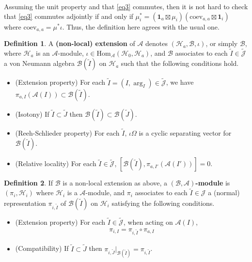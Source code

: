 \documentclass[11pt,b5paper,notitlepage]{article}
\theoremstyle{definition}
\newtheorem{df}{Definition}[section]
\theoremstyle{plain}
\newcommand{\mc}{\mathcal}
\newcommand{\wtd}{\widetilde}
\newcommand{\id}{\mathbf{1}}
\newcommand{\Hom}{\mathrm{Hom}}
\newcommand{\coev}{\mathrm{coev}}
\newcommand{\Jtd}{\widetilde{\mathcal J}}
\numberwithin{equation}{section}
\begin{document}
Assuming the unit property and that \eqref{eq3} commutes, then it is not hard to check that \eqref{eq3} commutes adjointly if and only if $\mu_i^*=(\id_a\boxtimes\mu_i)(\coev_{a,a}\boxtimes\id_i)$ where $\coev_{a,a}=\mu^*\iota$. Thus, the definition here agrees with the usual one.

	
\begin{df}\label{lb16}
A \textbf{(non-local) extension} of $\mc A$ denotes $(\mc H_a,\mc B,\iota)$, or simply $\mc B$, where $\mc H_a$ is an $\mc A$-module, $\iota\in\Hom_{\mc A}(\mc H_0,\mc H_a)$, and $\mc B$ associates to each $\wtd I\in\Jtd$ a von Neumann algebra $\mc B(\wtd I)$ on $\mc H_a$ such that the following conditions hold.
\begin{itemize}
\item (Extension property) For each $\wtd I=(I,\arg_I)\in\Jtd$, we have $\pi_{a,I}(\mc A(I))\subset\mc B(\wtd I)$.
\item (Isotony) If $\wtd I\subset\wtd J$ then $\mc B(\wtd I)\subset\mc B(\wtd J)$.
\item (Reeh-Schlieder property) For each $\wtd I$, $\iota\Omega$ is a cyclic separating vector for $\mc B(\wtd I)$.
\item (Relative locality) For each $\wtd I\in\Jtd$, $[\mc B(\wtd I),\pi_{a,I'}(\mc A(I'))]=0$.
\end{itemize}
\end{df}

	
\begin{df}\label{lb7}
If $\mc B$ is a non-local extension as above, a \textbf{$(\mc B,\mc A)$-module} is $(\pi_i,\mc H_i)$ where $\mc H_i$ is a $\mc A$-module, and $\pi_i$ associates to each $\wtd I\in\mc J$ a (normal) representation $\pi_{i,\wtd I}$ of $\mc B(\wtd I)$ on $\mc H_i$ satisfying the following conditions.
\begin{itemize}
\item (Extension property) For each $\wtd I\in\Jtd$, when acting on $\mc A(I)$,
\begin{align}
\pi_{i,I}=\pi_{i,\wtd I}\circ\pi_{a,I}\label{eq6}	
\end{align}
\item (Compatibility) If $\wtd I\subset\wtd J$ then $\pi_{i,\wtd J}|_{\mc B(\wtd I)}=\pi_{i,\wtd I}$.
\end{itemize}
\end{df}
\end{document}
